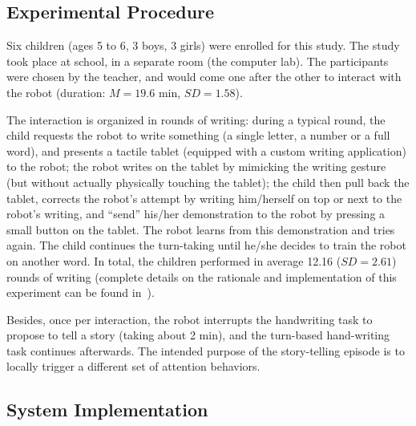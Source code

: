 \documentclass{sig-alternate}
\begin{document}
\subsection{Experimental Procedure}

Six children (ages 5 to 6, 3 boys, 3 girls) were enrolled for this study.
The study took place at school, in a separate room (the computer
lab). The participants were chosen by the teacher, and would come one after the
other to interact with the robot (duration: $M=19.6$ min, $SD=1.58$).

The interaction is organized in rounds of writing: during a typical round, the
child requests the robot to write something (a single letter, a number or a full
word), and presents a tactile tablet (equipped with a custom writing
application) to the robot; the robot writes on the tablet by mimicking the
writing gesture (but without actually physically touching the tablet); the child
then pull back the tablet, corrects the robot's attempt by writing him/herself
on top or next to the robot's writing, and ``send'' his/her demonstration to the
robot by pressing a small button on the tablet. The robot learns from this
demonstration and tries again. The child continues the turn-taking until he/she
decides to train the robot on another word. In total, the children performed in
average 12.16 ($SD=2.61$) rounds of writing (complete details on the rationale
and implementation of this experiment can be found in~\cite{Hood:2015}).


Besides, once per interaction, the robot interrupts the handwriting task to
propose to tell a story (taking about 2 min), and the turn-based
hand-writing task continues afterwards. The intended purpose of the
story-telling episode is to locally trigger a different set of attention behaviors.


\subsection{System Implementation}

\label{sec:system}
\end{document}
